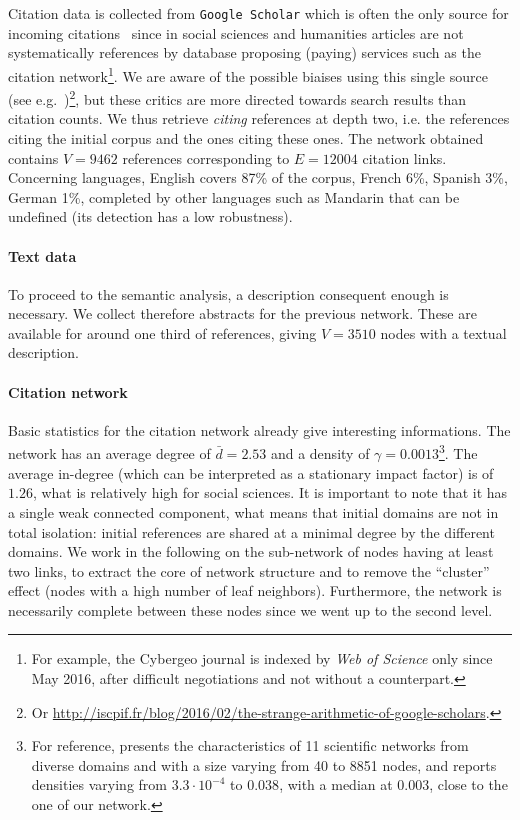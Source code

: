 \documentclass[galley]{jtlu-article-2col}
\begin{document}
Citation data is collected from \texttt{Google Scholar} which is often the only source for incoming citations~\cite{noruzi2005google} since in social sciences and humanities articles are not systematically references by database proposing (paying) services such as the citation network\footnote{For example, the Cybergeo journal is indexed by \textit{Web of Science} only since May 2016, after difficult negotiations and not without a counterpart.}. We are aware of the possible biaises using this single source (see e.g.~\cite{bohannon2014scientific})\footnote{Or \url{http://iscpif.fr/blog/2016/02/the-strange-arithmetic-of-google-scholars}.}, but these critics are more directed towards search results than citation counts. We thus retrieve \emph{citing} references at depth two, i.e. the references citing the initial corpus and the ones citing these ones. The network obtained contains $V=9462$ references corresponding to $E=12004$ citation links. Concerning languages, English covers 87\% of the corpus, French 6\%, Spanish 3\%, German 1\%, completed by other languages such as Mandarin that can be undefined (its detection has a low robustness).

\paragraph{Text data}

To proceed to the semantic analysis, a description consequent enough is necessary. We collect therefore abstracts for the previous network. These are available for around one third of references, giving $V=3510$ nodes with a textual description.

\paragraph{Citation network}

Basic statistics for the citation network already give interesting informations. The network has an average degree of $\bar{d}=2.53$ and a density of $\gamma=0.0013$\footnote{For reference, \cite{batagelj2003efficient} presents the characteristics of 11 scientific networks from diverse domains and with a size varying from 40 to 8851 nodes, and reports densities varying from $3.3\cdot 10^{-4}$ to $0.038$, with a median at $0.003$, close to the one of our network.}. The average in-degree (which can be interpreted as a stationary impact factor) is of $1.26$, what is relatively high for social sciences. It is important to note that it has a single weak connected component, what means that initial domains are not in total isolation: initial references are shared at a minimal degree by the different domains. We work in the following on the sub-network of nodes having at least two links, to extract the core of network structure and to remove the ``cluster'' effect (nodes with a high number of leaf neighbors). Furthermore, the network is necessarily complete between these nodes since we went up to the second level.
\end{document}
